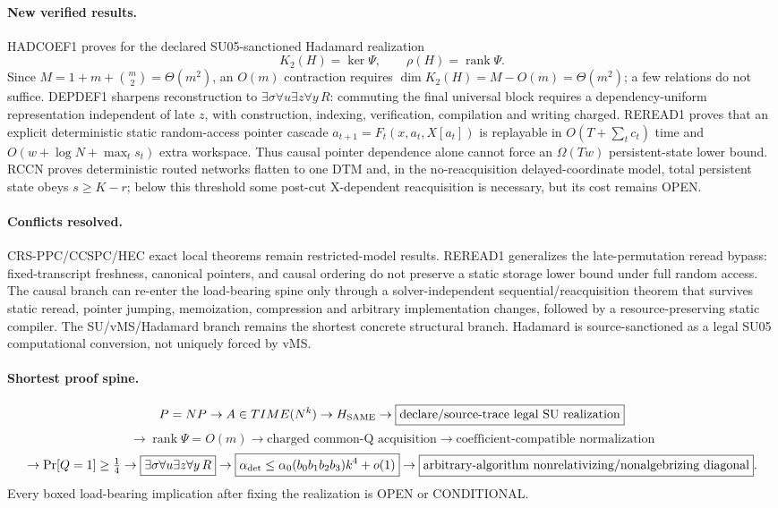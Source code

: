 \documentclass[11pt]{article}
\begin{document}
\paragraph{New verified results.} HADCOEF1 proves for the declared SU05-sanctioned Hadamard realization
\[
\boxed{K_2(H)=\ker\Psi,\qquad \rho(H)=\operatorname{rank}\Psi}.
\]
Since \(M=1+m+\binom m2=\Theta(m^2)\), an \(O(m)\) contraction requires \(\dim K_2(H)=M-O(m)=\Theta(m^2)\); a few relations do not suffice. DEPDEF1 sharpens reconstruction to \(\exists\sigma\forall u\exists z\forall y\,R\): commuting the final universal block requires a dependency-uniform representation independent of late \(z\), with construction, indexing, verification, compilation and writing charged. REREAD1 proves that an explicit deterministic static random-access pointer cascade \(a_{t+1}=F_t(x,a_t,X[a_t])\) is replayable in \(O(T+\sum_t c_t)\) time and \(O(w+\log N+\max_t s_t)\) extra workspace. Thus causal pointer dependence alone cannot force an \(\Omega(Tw)\) persistent-state lower bound. RCCN proves deterministic routed networks flatten to one DTM and, in the no-reacquisition delayed-coordinate model, total persistent state obeys \(s\ge K-r\); below this threshold some post-cut X-dependent reacquisition is necessary, but its cost remains OPEN.

\paragraph{Conflicts resolved.} CRS-PPC/CCSPC/HEC exact local theorems remain restricted-model results. REREAD1 generalizes the late-permutation reread bypass: fixed-transcript freshness, canonical pointers, and causal ordering do not preserve a static storage lower bound under full random access. The causal branch can re-enter the load-bearing spine only through a solver-independent sequential/reacquisition theorem that survives static reread, pointer jumping, memoization, compression and arbitrary implementation changes, followed by a resource-preserving static compiler. The SU/vMS/Hadamard branch remains the shortest concrete structural branch. Hadamard is source-sanctioned as a legal SU05 computational conversion, not uniquely forced by vMS.

\paragraph{Shortest proof spine.}
\[
P=NP\to A\in TIME(N^k)\to H_{\rm SAME}\to\boxed{\text{declare/source-trace legal SU realization}}
\]
\[
\to\boxed{\operatorname{rank}\Psi=O(m)}\to\boxed{\text{charged common-Q acquisition}}\to\boxed{\text{coefficient-compatible normalization}}
\]
\[
\to\Pr[Q=1]\ge\tfrac14\to\boxed{\exists\sigma\forall u\exists z\forall y\,R}
\to\boxed{\alpha_{\rm det}\le\alpha_0(b_0b_1b_2b_3)k^4+o(1)}
\to\boxed{\text{arbitrary-algorithm nonrelativizing/nonalgebrizing diagonal}}.
\]
Every boxed load-bearing implication after fixing the realization is OPEN or CONDITIONAL.
\end{document}
